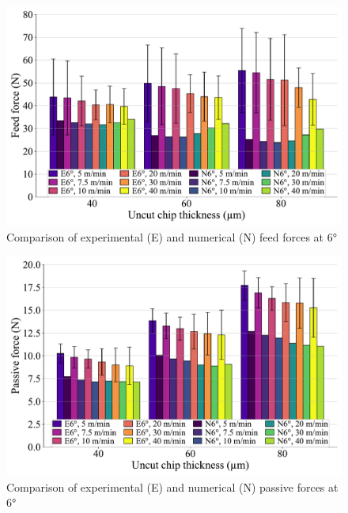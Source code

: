 \documentclass[final,5p,times,twocolumn]{elsarticle}
\begin{document}
\begin{figure}[h]
\centering
\includegraphics[width=\columnwidth]{Figures/Fy_6}
\caption{Comparison of experimental (E) and numerical (N) feed forces at 6°}
\label{Fy_6}
\end{figure}

\begin{figure}[h]
\centering
\includegraphics[width=\columnwidth]{Figures/Fz_6}
\caption{Comparison of experimental (E) and numerical (N) passive forces at 6°}
\label{Fz_6}
\end{figure}
\end{document}
